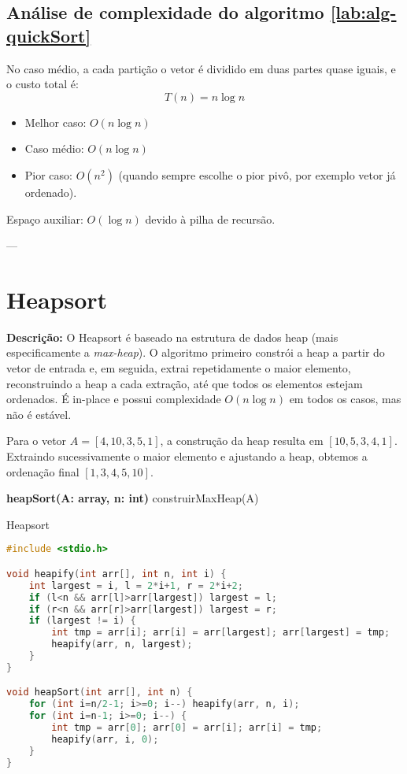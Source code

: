 \subsection{Análise de complexidade do algoritmo \ref{lab:alg-quickSort}}
No caso médio, a cada partição o vetor é dividido em duas partes quase iguais, e o custo total é:
\[
T(n) = n \log n
\]
\begin{itemize}
    \item Melhor caso: $O(n \log n)$
    \item Caso médio: $O(n \log n)$
    \item Pior caso: $O(n^2)$ (quando sempre escolhe o pior pivô, por exemplo vetor já ordenado).
\end{itemize}
Espaço auxiliar: $O(\log n)$ devido à pilha de recursão.

---


\section{Heapsort}

\textbf{Descrição:} O Heapsort é baseado na estrutura de dados heap (mais especificamente a \textit{max-heap}). O algoritmo primeiro constrói a heap a partir do vetor de entrada e, em seguida, extrai repetidamente o maior elemento, reconstruindo a heap a cada extração, até que todos os elementos estejam ordenados. É in-place e possui complexidade $O(n \log n)$ em todos os casos, mas não é estável.


\begin{exmp}
Para o vetor $A = [4, 10, 3, 5, 1]$, a construção da heap resulta em $[10, 5, 3, 4, 1]$.  
Extraindo sucessivamente o maior elemento e ajustando a heap, obtemos a ordenação final $[1, 3, 4, 5, 10]$.
\end{exmp}

\begin{algorithm}[H]
\DontPrintSemicolon
\textbf{heapSort(A: array, n: int)}\;
construirMaxHeap(A)\;
\caption{Heapsort}
\label{lab:alg-heapSort}
\end{algorithm}

\begin{lstlisting}[language=C, caption={Implementação do Heapsort em C}, label=code:heapSort]
#include <stdio.h>

void heapify(int arr[], int n, int i) {
    int largest = i, l = 2*i+1, r = 2*i+2;
    if (l<n && arr[l]>arr[largest]) largest = l;
    if (r<n && arr[r]>arr[largest]) largest = r;
    if (largest != i) {
        int tmp = arr[i]; arr[i] = arr[largest]; arr[largest] = tmp;
        heapify(arr, n, largest);
    }
}

void heapSort(int arr[], int n) {
    for (int i=n/2-1; i>=0; i--) heapify(arr, n, i);
    for (int i=n-1; i>=0; i--) {
        int tmp = arr[0]; arr[0] = arr[i]; arr[i] = tmp;
        heapify(arr, i, 0);
    }
}
\end{lstlisting}

